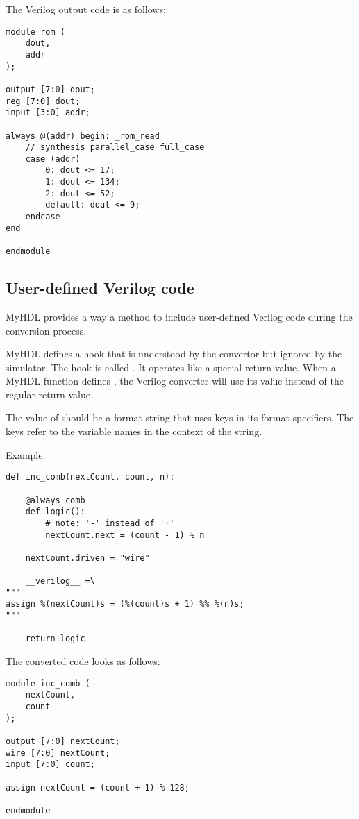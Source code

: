 The Verilog output code is as follows:

\begin{verbatim}
module rom (
    dout,
    addr
);
                                                                                
output [7:0] dout;
reg [7:0] dout;
input [3:0] addr;
                                                                       
always @(addr) begin: _rom_read
    // synthesis parallel_case full_case
    case (addr)
        0: dout <= 17;
        1: dout <= 134;
        2: dout <= 52;
        default: dout <= 9;
    endcase
end
                                                                                
endmodule
\end{verbatim}

\subsection{User-defined Verilog code \label{conf-usage-custom}}

MyHDL provides a way a method to include user-defined Verilog
code during the conversion process.

MyHDL defines a hook that is understood by the convertor but ignored by
the simulator. The hook is called . It operates
like a special return value. When a MyHDL function defines
, the Verilog converter will use its value instead of the
regular return value.

The value of  should be a format string that uses keys in
its format specifiers. The keys refer to the variable names in the
context of the string.

Example:

\begin{verbatim}
def inc_comb(nextCount, count, n):

    @always_comb
    def logic():
        # note: '-' instead of '+'
        nextCount.next = (count - 1) % n

    nextCount.driven = "wire"

    __verilog__ =\
"""
assign %(nextCount)s = (%(count)s + 1) %% %(n)s;
"""

    return logic
\end{verbatim}

The converted code looks as follows:

\begin{verbatim}
module inc_comb (
    nextCount,
    count
);

output [7:0] nextCount;
wire [7:0] nextCount;
input [7:0] count;

assign nextCount = (count + 1) % 128;

endmodule
\end{verbatim}

